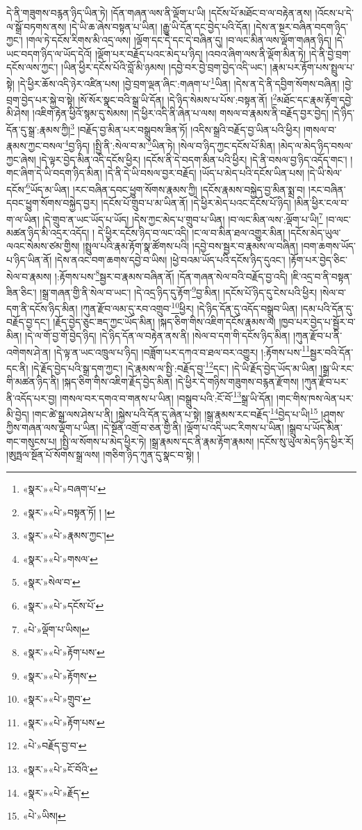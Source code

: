 དེ་ནི་གཟུགས་བརྙན་ཉིད་ཡིན་ཏེ། །དོན་གཞན་ལས་ནི་ལྡོག་པ་ཡི། །དངོས་པོ་མཐོང་བ་ལ་བརྟེན་ནས། །འོངས་པ་དེ་ལ་སྒྲོ་བཏགས་ནས། །དེ་ཡི་ཆ་ཞེས་བསྟན་པ་ཡིན། །རྒྱུ་ཡི་དོན་དང་བྱེད་པའི་དོན། །དེས་ན་སྔར་བཞིན་བདག་ཉིད་ཀྱང་། །གལ་ཏེ་དངོས་རིགས་མི་འདྲ་ལས། །ལྡོག་དང་དེ་དང་དེ་བཞིན་དུ། །བ་ལང་མིན་ལས་ལྡོག་གཞན་ཉིད། །དེ་ཡང་བདག་ཉིད་ལ་ཡོད་དེའོ། །ལྡོག་པར་བརྗོད་པའང་མེད་པ་ཉིད། །འབའ་ཞིག་ལས་ནི་ལྡོག་མིན་ཏེ། །དེ་ནི་བྱེ་བྲག་དངོས་ལས་ཀྱང་། །ཡིན་ཕྱིར་དངོས་པོའི་བློ་མི་ཉམས། །དབྱེ་བར་བྱེ་བྲག་བྱེད་འདི་ཡང་། །རྣམ་པར་རྟོག་པས་སྤྲུལ་པ་སྟེ། །དེ་ཕྱིར་ཆོས་འདི་ཉེར་འཛིན་པས། །བྱེ་བྲག་ལྡན་ཞིང་:གཞག་པ་\footnote{«སྣར་»«པེ་»བཞག་པ་}ཡིན། །དེས་ན་དེ་ནི་དབྱིག་སོགས་བཞིན། །བྱེ་བྲག་བྱེད་པར་སྐྱེ་བ་སྟེ། །སོ་སོར་སྣང་བའི་སྒྲ་ཡི་དོན། །དེ་ཉིད་སེམས་པ་པོས་:བསྟན་ནོ། །\footnote{«སྣར་»«པེ་»བསྟན་ཏོ། ། །}མཐོང་དང་རྣམ་རྟོག་དབྱེ་མི་ཤེས། །འཇིག་རྟེན་ཕྱིའོ་སྙམ་དུ་སེམས། །དེ་ཕྱིར་འདི་ནི་ཞེན་པ་ལས། གསལ་བ་རྣམས་ནི་བརྗོད་བྱར་བྱེད། །དེ་ཉིད་དོན་དུ་སྒྲ་:རྣམས་ཀྱི།\footnote{«སྣར་»«པེ་»རྣམས་ཀྱང་།} །བརྗོད་བྱ་མིན་པར་བསྒྲུབས་ཟིན་ཏོ། །འདིས་སྒྲའི་བརྗོད་བྱ་ཡིན་པའི་ཕྱིར། །གསལ་བ་རྣམས་ཀྱང་བསལ་\footnote{«སྣར་»«པེ་»གསལ་}བྱ་ཉིད། །སྤྱི་ནི་:སེལ་བ་མ་\footnote{«སྣར་»སེལ་བ་}ཡིན་ཏེ། །སེལ་བ་ཉིད་ཀྱང་དངོས་པོ་མིན། །མེད་ལ་མེད་ཉིད་བསལ་ཀྱང་ཞེས། །དེ་ལྟར་བྱེད་མིན་འདི་དངོས་ཕྱིར། །དངོས་ནི་དེ་བདག་མིན་པའི་ཕྱིར། །དེ་ནི་བསལ་བྱ་ཉིད་འདོད་གང་། །གང་ཞིག་དེ་ཡི་བདག་ཉིད་མིན། །དེ་ནི་དེ་ཡི་བསལ་བྱར་བརྗོད། །ཡོད་པ་མེད་པའི་དངོས་ཡིན་པས། །དེ་ཡི་སེལ་དངོས་\footnote{«སྣར་»«པེ་»དངོས་པོ་}ཡོད་མ་ཡིན། །རང་བཞིན་དབང་ཕྱུག་སོགས་རྣམས་ཀྱི། །དངོས་རྣམས་བསྐྱེད་བྱ་མིན་སྨྲ་བ། །རང་བཞིན་དབང་ཕྱུག་སོགས་བསྐྱེད་བྱར། །དངོས་པོ་གྲུབ་པ་མ་ཡིན་ནོ། །དེ་ཕྱིར་མེད་པའང་དངོས་པོ་ཉིད། །མིན་ཕྱིར་ངལ་བ་ག་ལ་ཡིན། །དེ་གྲུབ་ན་ཡང་ཡོད་པ་ཡོད། །དེས་ཀྱང་མེད་པ་གྲུབ་པ་ཡིན། །བ་ལང་མིན་ལས་:ལྡོག་པ་ཡི།\footnote{«པེ་»ལྡོག་པ་ཡིས།} །བ་ལང་མཚན་ཉིད་མི་འདྲར་འདོད། །
དེ་ཕྱིར་དངོས་ཉིད་བ་ལང་འདི། །ང་ལ་བ་མིན་ཐལ་འགྱུར་མིན། །དངོས་མེད་ཡུལ་ལའང་སེམས་ཙམ་གྱིས། །སྤྲུལ་པའི་རྣམ་རྟོག་སྣ་ཚོགས་པའི། །དབྱེ་བས་སྦྱར་བ་རྣམས་ལ་བཞིན། །བག་ཆགས་ཡོད་པ་ཉིད་ཡིན་ནོ། །དེས་ནའང་བག་ཆགས་དབྱེ་བ་ཡིས། །ཕྱེ་བའམ་ཡོད་པའི་དངོས་ཉིད་དུའང་། །རྟོག་པར་བྱེད་ཅིང་སེལ་བ་རྣམས། །:རྟོགས་པས་\footnote{«སྣར་»«པེ་»རྟོག་པས་}སྦྱར་བ་རྣམས་བཞིན་ནོ། །དོན་གཞན་སེལ་བའི་བརྗོད་བྱ་འདི། །ཇི་འདྲ་བ་ནི་བསྟན་ཟིན་ཅིང་། །སྒྲ་གཞན་གྱི་ནི་སེལ་བ་ཡང་། །དེ་འདྲ་ཉིད་དུ་རྟོག་\footnote{«སྣར་»«པེ་»རྟོགས་}བྱ་མིན། །དངོས་པོ་ཉིད་དུ་ངེས་པའི་ཕྱིར། །སེལ་བ་དག་ནི་དངོས་ཉིད་མིན། །ཀུན་རྫོབ་ལམ་དུ་རབ་འགྲུབ་\footnote{«སྣར་»«པེ་»གྲུབ་}ཕྱིར། །དེ་ཉིད་དོན་དུ་འདོད་བསྒྲུབ་ཡིན། །དམ་པའི་དོན་དུ་བརྗོད་བྱ་དང་། །རྗོད་བྱེད་ཅུང་ཟད་ཀྱང་ཡོད་མིན། །སྐད་ཅིག་གིས་འཇིག་དངོས་རྣམས་ལ། །ཁྱབ་པར་བྱེད་པ་སྦྱོར་བ་མིན། །དེ་ལ་གོ་བྱ་གོ་བྱེད་ཉིད། །དེ་ཉིད་དོན་ལ་བརྟེན་ནས་ནི། །སེལ་བ་དག་གི་དངོས་ཉིད་མིན། །ཀུན་རྫོབ་པ་ནི་འགེགས་ཤེ་ན། །དེ་ལྟ་ན་ཡང་འཁྲུལ་པ་ཉིད། །བཟློག་པར་དཀའ་བ་ཐལ་བར་འགྱུར། །:རྟོགས་པས་\footnote{«སྣར་»«པེ་»རྟོག་པས་}སྦྱར་བའི་དོན་དང་ནི། །དེ་རྗོད་བྱེད་པའི་སྒྲ་དག་ཀྱང་། །དེ་རྣམས་ལ་སྤྱི་:བརྗོད་བྱ་\footnote{«པེ་»བརྗོད་བྱ་བ་}དང་། །དེ་ཡི་རྗོད་བྱེད་ཡོད་མ་ཡིན། །སྒྲ་ཡི་རང་གི་མཚན་ཉིད་ནི། །སྐད་ཅིག་གིས་འཇིག་རྗོད་བྱེད་མིན། །དེ་ཕྱིར་དེ་གཉིས་གཟུགས་བརྙན་རྫོགས། །ཀུན་རྫོབ་པར་ནི་འདོད་པར་བྱ། །གསལ་བར་དགའ་བ་གནས་པ་ཡིན། །བསྒྲུབ་པའི་:ངོ་བོ་\footnote{«སྣར་»«པེ་»ངོ་བོའི་}སྒྲ་ཡི་དོན། །གང་གིས་ཁས་ལེན་པར་མི་བྱེད། །གང་ཚེ་སྒྲ་ལས་ཤེས་པ་ནི། །སྐྱེས་པའི་དོན་དུ་ཞེན་པ་སྟེ། །སྒྲ་རྣམས་རང་བརྗོད་\footnote{«སྣར་»«པེ་»རྗོད་}བྱེད་པ་ཡི།\footnote{«པེ་»ཡིས།} །ཤུགས་ཀྱིས་གཞན་ལས་ལྡོག་པ་ཡིན། །དེ་སྔོན་འགྲོ་བ་ཅན་གྱི་ནི། །ལྡོག་པ་འདི་ཡང་རིགས་པ་ཡིན། །སྒྲུབ་པ་ཡོད་མིན་གང་གསུངས་པ། །སྤྱི་ལ་སོགས་པ་མེད་ཕྱིར་ཏེ། །སྒྲ་རྣམས་དང་ནི་རྣམ་རྟོག་རྣམས། །དངོས་སུ་ཡུལ་མེད་ཉིད་ཕྱིར་རོ། །ཨུཏྤལ་སྔོན་པོ་སོགས་སྒྲ་ལས། །གཅིག་ཉིད་ཀུན་དུ་སྣང་བ་སྟེ། །
